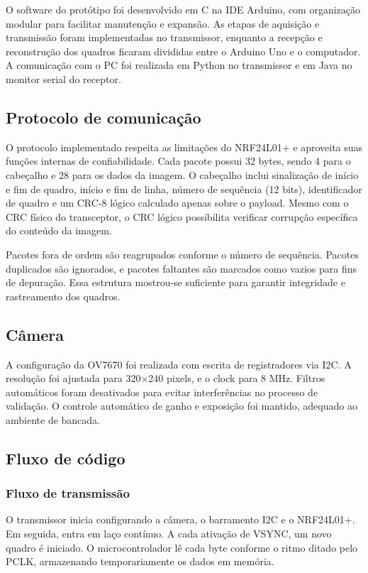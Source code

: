 \documentclass[repeatfields,xlists,xpacks,oneside]{ufrgscca}
\begin{document}
O software do protótipo foi desenvolvido em C na IDE Arduino, com organização modular para facilitar manutenção e expansão. As etapas de aquisição e transmissão foram implementadas no transmissor, enquanto a recepção e reconstrução dos quadros ficaram divididas entre o Arduino Uno e o computador. A comunicação com o PC foi realizada em Python no transmissor e em Java no monitor serial do receptor.

\subsection{Protocolo de comunicação}

O protocolo implementado respeita as limitações do NRF24L01+ e aproveita suas funções internas de confiabilidade. Cada pacote possui 32 bytes, sendo 4 para o cabeçalho e 28 para os dados da imagem. O cabeçalho inclui sinalização de início e fim de quadro, início e fim de linha, número de sequência (12 bits), identificador de quadro e um CRC-8 lógico calculado apenas sobre o payload. Mesmo com o CRC físico do transceptor, o CRC lógico possibilita verificar corrupção específica do conteúdo da imagem.

Pacotes fora de ordem são reagrupados conforme o número de sequência. Pacotes duplicados são ignorados, e pacotes faltantes são marcados como vazios para fins de depuração. Essa estrutura mostrou-se suficiente para garantir integridade e rastreamento dos quadros.

\subsection{Câmera}

A configuração da OV7670 foi realizada com escrita de registradores via I2C. A resolução foi ajustada para 320×240 pixels, e o clock para 8 MHz. Filtros automáticos foram desativados para evitar interferências no processo de validação. O controle automático de ganho e exposição foi mantido, adequado ao ambiente de bancada.

\subsection{Fluxo de código}

\subsubsection{Fluxo de transmissão}

O transmissor inicia configurando a câmera, o barramento I2C e o NRF24L01+. Em seguida, entra em laço contínuo. A cada ativação de VSYNC, um novo quadro é iniciado. O microcontrolador lê cada byte conforme o ritmo ditado pelo PCLK, armazenando temporariamente os dados em memória.
\end{document}
